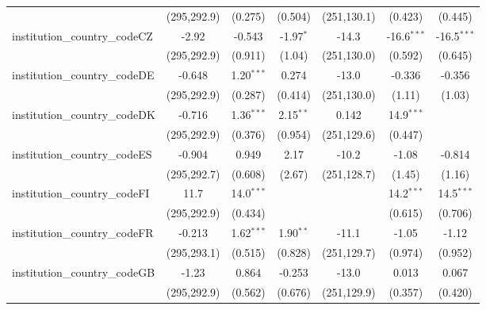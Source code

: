 \begin{tabular}{lcccccc}
                                         & (295,292.9)   & (0.275)       & (0.504)       & (251,130.1)   & (0.423)       & (0.445)\\   
   institution\_country\_codeCZ          & -2.92         & -0.543        & -1.97$^{*}$   & -14.3         & -16.6$^{***}$ & -16.5$^{***}$\\   
                                         & (295,292.9)   & (0.911)       & (1.04)        & (251,130.0)   & (0.592)       & (0.645)\\   
   institution\_country\_codeDE          & -0.648        & 1.20$^{***}$  & 0.274         & -13.0         & -0.336        & -0.356\\   
                                         & (295,292.9)   & (0.287)       & (0.414)       & (251,130.0)   & (1.11)        & (1.03)\\   
   institution\_country\_codeDK          & -0.716        & 1.36$^{***}$  & 2.15$^{**}$   & 0.142         & 14.9$^{***}$  &   \\   
                                         & (295,292.9)   & (0.376)       & (0.954)       & (251,129.6)   & (0.447)       &   \\   
   institution\_country\_codeES          & -0.904        & 0.949         & 2.17          & -10.2         & -1.08         & -0.814\\   
                                         & (295,292.7)   & (0.608)       & (2.67)        & (251,128.7)   & (1.45)        & (1.16)\\   
   institution\_country\_codeFI          & 11.7          & 14.0$^{***}$  &               &               & 14.2$^{***}$  & 14.5$^{***}$\\   
                                         & (295,292.9)   & (0.434)       &               &               & (0.615)       & (0.706)\\   
   institution\_country\_codeFR          & -0.213        & 1.62$^{***}$  & 1.90$^{**}$   & -11.1         & -1.05         & -1.12\\   
                                         & (295,293.1)   & (0.515)       & (0.828)       & (251,129.7)   & (0.974)       & (0.952)\\   
   institution\_country\_codeGB          & -1.23         & 0.864         & -0.253        & -13.0         & 0.013         & 0.067\\   
                                         & (295,292.9)   & (0.562)       & (0.676)       & (251,129.9)   & (0.357)       & (0.420)\\   

\end{tabular}
